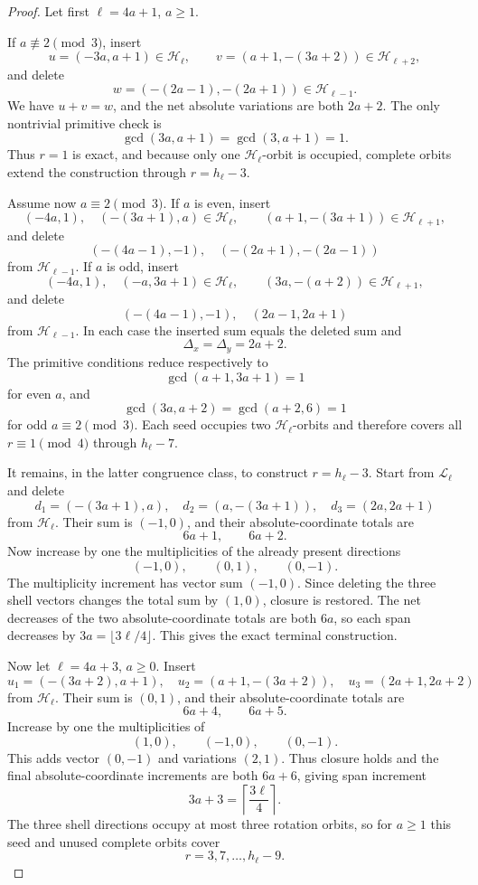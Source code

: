 \documentclass[11pt]{article}
\theoremstyle{definition}
\newcommand{\HH}{\mathcal H}
\newcommand{\LL}{\mathcal L}
\begin{document}
\begin{proof}
Let first \(\ell=4a+1\), \(a\ge1\).

If \(a\not\equiv2\pmod3\), insert
\[
u=(-3a,a+1)\in\HH_\ell,\qquad
v=(a+1,-(3a+2))\in\HH_{\ell+2},
\]
and delete
\[
w=(-(2a-1),-(2a+1))\in\HH_{\ell-1}.
\]
We have \(u+v=w\), and the net absolute variations are both \(2a+2\).  The only nontrivial primitive check is
\[
\gcd(3a,a+1)=\gcd(3,a+1)=1.
\]
Thus \(r=1\) is exact, and because only one \(\HH_\ell\)-orbit is occupied, complete orbits extend the construction through \(r=h_\ell-3\).

Assume now \(a\equiv2\pmod3\).  If \(a\) is even, insert
\[
(-4a,1),\quad (-(3a+1),a)\in\HH_\ell,\qquad
(a+1,-(3a+1))\in\HH_{\ell+1},
\]
and delete
\[
(-(4a-1),-1),\quad (-(2a+1),-(2a-1))
\]
from \(\HH_{\ell-1}\).
If \(a\) is odd, insert
\[
(-4a,1),\quad (-a,3a+1)\in\HH_\ell,\qquad
(3a,-(a+2))\in\HH_{\ell+1},
\]
and delete
\[
(-(4a-1),-1),\quad (2a-1,2a+1)
\]
from \(\HH_{\ell-1}\).
In each case the inserted sum equals the deleted sum and
\[
\Delta_x=\Delta_y=2a+2.
\]
The primitive conditions reduce respectively to
\[
\gcd(a+1,3a+1)=1
\]
for even \(a\), and
\[
\gcd(3a,a+2)=\gcd(a+2,6)=1
\]
for odd \(a\equiv2\pmod3\).  Each seed occupies two \(\HH_\ell\)-orbits and therefore covers all \(r\equiv1\pmod4\) through \(h_\ell-7\).

It remains, in the latter congruence class, to construct \(r=h_\ell-3\).  Start from \(\LL_\ell\) and delete
\[
d_1=(-(3a+1),a),\quad
d_2=(a,-(3a+1)),\quad
d_3=(2a,2a+1)
\]
from \(\HH_\ell\).  Their sum is \((-1,0)\), and their absolute-coordinate totals are
\[
6a+1,\qquad6a+2.
\]
Now increase by one the multiplicities of the already present directions
\[
(-1,0),\qquad(0,1),\qquad(0,-1).
\]
The multiplicity increment has vector sum \((-1,0)\).  Since deleting the three shell vectors changes the total sum by \((1,0)\), closure is restored.  The net decreases of the two absolute-coordinate totals are both \(6a\), so each span decreases by \(3a=\lfloor3\ell/4\rfloor\).  This gives the exact terminal construction.

Now let \(\ell=4a+3\), \(a\ge0\).  Insert
\[
u_1=(-(3a+2),a+1),\quad
u_2=(a+1,-(3a+2)),\quad
u_3=(2a+1,2a+2)
\]
from \(\HH_\ell\).  Their sum is \((0,1)\), and their absolute-coordinate totals are
\[
6a+4,\qquad6a+5.
\]
Increase by one the multiplicities of
\[
(1,0),\qquad(-1,0),\qquad(0,-1).
\]
This adds vector \((0,-1)\) and variations \((2,1)\).  Thus closure holds and the final absolute-coordinate increments are both \(6a+6\), giving span increment
\[
3a+3=\left\lceil\frac{3\ell}{4}\right\rceil.
\]
The three shell directions occupy at most three rotation orbits, so for \(a\ge1\) this seed and unused complete orbits cover
\[
r=3,7,\ldots,h_\ell-9.
\]


\end{proof}
\end{document}
